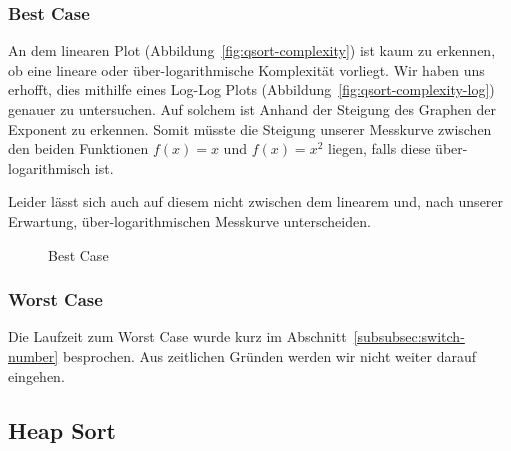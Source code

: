 \subsubsection{Best Case}\label{subsubsec:qsort-best-case}

An dem linearen Plot (Abbildung~\ref{fig:qsort-complexity})
ist kaum zu erkennen, ob eine lineare oder
über-logarithmische Komplexität vorliegt.
Wir haben uns erhofft, dies mithilfe eines Log-Log Plots
(Abbildung~\ref{fig:qsort-complexity-log}) genauer zu untersuchen.
Auf solchem ist Anhand der Steigung des Graphen der Exponent zu erkennen.
Somit müsste die Steigung unserer Messkurve zwischen den beiden Funktionen
\(f(x)=x\) und \(f(x)=x^2\) liegen, falls diese über-logarithmisch ist.

Leider lässt sich auch auf diesem nicht zwischen dem linearem und, nach
unserer Erwartung, über-logarithmischen Messkurve unterscheiden.

\begin{figure}[hbt]
    \centering
    \caption{Best Case}
\end{figure}

\subsubsection{Worst Case}\label{subsubsec:worst-case}
Die Laufzeit zum Worst Case wurde kurz im
Abschnitt~\ref{subsubsec:switch-number} besprochen.
Aus zeitlichen Gründen werden wir nicht weiter darauf eingehen.


\FloatBarrier

\subsection{Heap Sort}\label{subsec:heap-sort-laufzeit}
